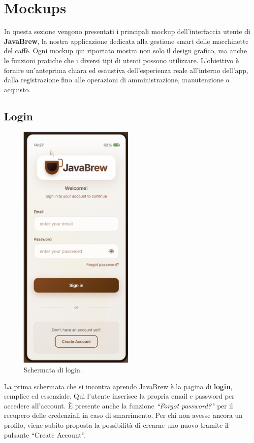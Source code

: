 \section{Mockups}

In questa sezione vengono presentati i principali mockup dell’interfaccia utente di \textbf{JavaBrew}, la nostra applicazione dedicata alla gestione smart delle macchinette del caffè. Ogni mockup qui riportato mostra non solo il design grafico, ma anche le funzioni pratiche che i diversi tipi di utenti possono utilizzare. L’obiettivo è fornire un’anteprima chiara ed esaustiva dell’esperienza reale all’interno dell’app, dalla registrazione fino alle operazioni di amministrazione, manutenzione o acquisto.

\subsection{Login}
\begin{figure}[H]
    \centering
    \includegraphics[width=0.5\textwidth]{./assets/login.png}
    \caption{Schermata di login.}
\end{figure}
La prima schermata che si incontra aprendo JavaBrew è la pagina di \textbf{login}, semplice ed essenziale. Qui l’utente inserisce la propria email e password per accedere all’account. È presente anche la funzione \emph{“Forgot password?”} per il recupero delle credenziali in caso di smarrimento. Per chi non avesse ancora un profilo, viene subito proposta la possibilità di crearne uno nuovo tramite il pulsante “Create Account”.

